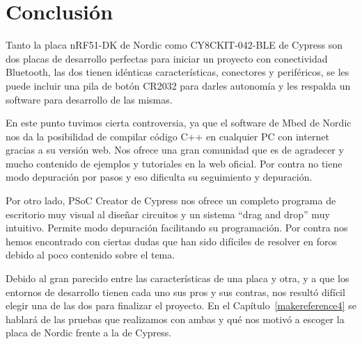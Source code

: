 \section{Conclusión}
\label{makereference3.5}

Tanto la placa nRF51-DK de Nordic como CY8CKIT-042-BLE de Cypress son dos placas de desarrollo perfectas para iniciar un proyecto con conectividad Bluetooth, las dos tienen idénticas características, conectores y periféricos, se les puede incluir una pila de botón CR2032 para darles autonomía y les respalda un software para desarrollo de las mismas.

En este punto tuvimos cierta controversia, ya que el software de Mbed de Nordic nos da la posibilidad de compilar código C++ en cualquier PC con internet gracias a su versión web. Nos ofrece una gran comunidad que es de agradecer y mucho contenido de ejemplos y tutoriales en la web oficial. Por contra no tiene modo depuración por pasos y eso dificulta su seguimiento y depuración. 

Por otro lado, PSoC Creator de Cypress nos ofrece un completo programa de escritorio muy visual al diseñar circuitos y un sistema “drag and drop” muy intuitivo. Permite modo depuración facilitando su programación. Por contra nos hemos encontrado con ciertas dudas que han sido difíciles de resolver en foros debido al poco contenido sobre el tema.

Debido al gran parecido entre las características de una placa y otra, y a que los entornos de desarrollo tienen cada uno sus pros y sus contras, nos resultó difícil elegir una de las dos para finalizar el proyecto. En el Capítulo~\ref{makereference4} se hablará de las pruebas que realizamos con ambas y qué nos motivó a escoger la placa de Nordic frente a la de Cypress.